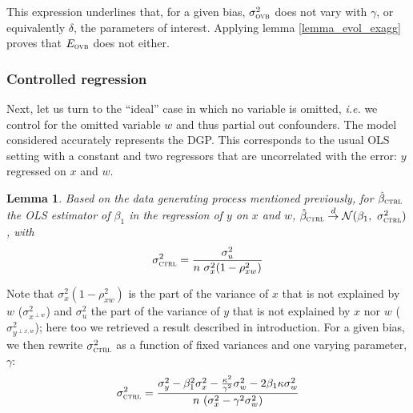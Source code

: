 \documentclass[usletter, 12pt]{article}
\newtheorem{lemma}{Lemma}
\begin{document}
			 This expression underlines that, for a given bias,  $\sigma_{\textsc{ovb}}^{2}$ does not vary with $\gamma$, or equivalently $\delta$, the parameters of interest. Applying lemma \ref{lemma_evol_exagg} proves that $E_{\textsc{ovb}}$ does not either.

			
			\subsubsection{Controlled regression}
			
				Next, let us turn to the ``ideal'' case in which no variable is omitted, \textit{i.e.} we control for the omitted variable $w$ and thus partial out confounders. The model considered accurately represents the DGP.
%				
				This corresponds to the usual OLS setting with a constant and two regressors that are uncorrelated with the error: $y$ regressed on $x$ and $w$.
						
				\begin{lemma}\label{lemma_ctrl}
					Based on the data generating process mentioned previously, for $\hat{\beta}_{\textsc{ctrl}}$ the OLS estimator of $\beta_{1}$ in the regression of $y$ on $x$ and $w$, $\hat{\beta}_{\textsc{ctrl}} \overset{d}{\to} \mathcal{N}(\beta_{1}, \ \sigma_{\textsc{ctrl}}^{2})$, with
					\[
						\sigma_{\textsc{ctrl}}^{2} = \dfrac{\sigma_{u}^{2}}{n \ \sigma_{x}^{2} (1 - \rho_{xw}^{2})}
					\]
				\end{lemma}
				
				Note that $\sigma_{x}^{2} (1 - \rho_{xw}^{2})$ is the part of the variance of $x$ that is not explained by $w$ ($\sigma^{2}_{x^{\perp w}}$) and $\sigma_{u}^{2}$ the part of the variance of $y$ that is not explained by $x$ nor $w$ ($\sigma^{2}_{y^{\perp x, w}}$); here too we retrieved a result described in introduction. For a given bias, we then rewrite $\sigma_{\textsc{ctrl}}^{2}$ as a function of fixed variances and one varying parameter, $\gamma$:
				~
				\[
					\sigma_{\textsc{ctrl}}^{2} = \dfrac{\sigma_{y}^{2} - \beta_{1}^{2}\sigma_{x}^{2} - \frac{\kappa^{2}}{\gamma^{2}}\sigma_{w}^{2} - 2\beta_{1}\kappa \sigma_{w}^{2}}{n \ (\sigma_{x}^{2}  - \gamma^{2} \sigma_{w}^{2})}
				\]
				
\end{document}
